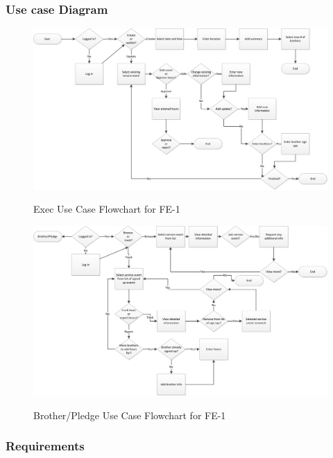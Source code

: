 \documentclass{article}
\begin{document}
\newpage
\subsubsection{Use case Diagram}

\FloatBarrier
\begin{figure}
\centering
\caption{Exec Use Case Flowchart for FE-1}
\includegraphics[scale=.7]{img/execUseCaseFE1.png}
\label{fig:execUseCaseFE1}
\end{figure}
\FloatBarrier

\newpage

\newpage

\FloatBarrier
\begin{figure}
\centering
\caption{Brother/Pledge Use Case Flowchart for FE-1}
\includegraphics[scale=.75]{img/brotherUseCaseFE1.png}
\label{fig:brotherUseCaseFE1}
\end{figure}
\FloatBarrier

\newpage

\subsubsection{Requirements}
\end{document}
